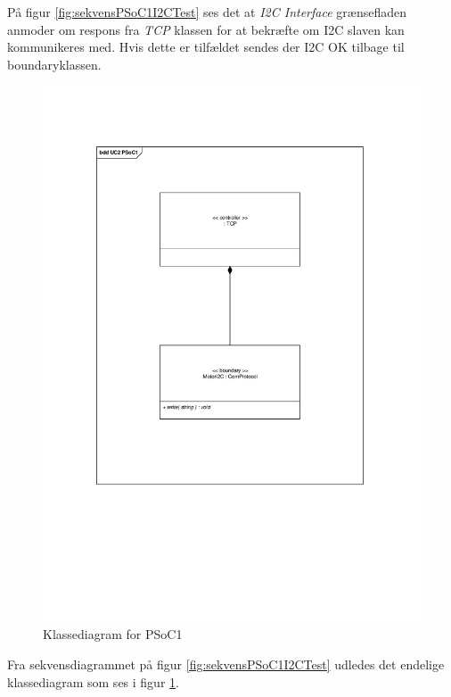 På figur \ref{fig:sekvensPSoC1I2CTest} ses det at \textit{I2C Interface} grænsefladen anmoder om respons fra \textit{TCP} klassen for at bekræfte om I2C slaven kan kommunikeres med. Hvis dette er tilfældet sendes der I2C OK tilbage til boundaryklassen.  

\begin{figure}[H]
	\centering
	\includegraphics[width=.5\textwidth]{Systemarkitektur/images/klassediagramPSoC1}
	\caption{Klassediagram for PSoC1}
	\label{fig:klassePSoC1}
\end{figure}

Fra sekvensdiagrammet på figur \ref{fig:sekvensPSoC1I2CTest} udledes det endelige klassediagram som ses i figur \ref{fig:klassePSoC1}.

